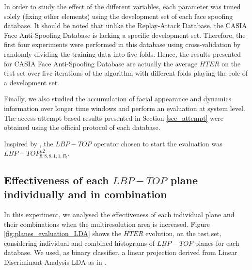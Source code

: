 In order to study the effect of the different variables, each parameter was tuned solely (fixing other elements) using the development set of each face spoofing database. It should be noted that unlike the Replay-Attack Database, the CASIA Face Anti-Spoofing Database is lacking a specific development set. Therefore, the first four experiments were performed in this database using cross-validation by randomly dividing the training data into five folds. Hence, the results presented for CASIA Face Anti-Spoofing Database are actually the average $HTER$ on the test set over five iterations of the algorithm with different folds playing the role of a development set.

Finally, we also studied the accumulation of facial appearance and dynamics information over longer time windows and perform an evaluation at system level. The access attempt based results presented in Section \ref{sec_attempt} were obtained using the official protocol of each database.

Inspired by \cite{ChingovskaBIOSIG2012}, the $LBP-TOP$ operator chosen to start the evaluation was $LBP-TOP_{8,8,8,1,1,R_{t}}^{u2}$. 

\subsection{Effectiveness of each $LBP-TOP$ plane individually and in combination}
\label{sec_lbptop_planes}

In this experiment, we analysed the effectiveness of each individual plane and their combinations when the multiresolution area is increased. Figure \ref{fig:planes_evaluation_LDA} shows the $HTER$ evolution, on the test set, considering individual and combined histograms of $LBP-TOP$ planes for each database. We used, as binary classifier, a linear projection derived from Linear Discriminant Analysis LDA as in \cite{ChingovskaBIOSIG2012}.

